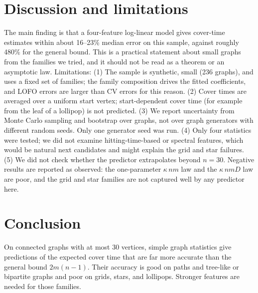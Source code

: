 \documentclass{article} %
\begin{document}
\section{Discussion and limitations}
The main finding is that a four-feature log-linear model gives cover-time estimates within about 16--23\% median error on this sample, against roughly 480\% for the general bound. This is a practical statement about small graphs from the families we tried, and it should not be read as a theorem or an asymptotic law. Limitations:
(1) The sample is synthetic, small (236 graphs), and uses a fixed set of families; the family composition drives the fitted coefficients, and LOFO errors are larger than CV errors for this reason.
(2) Cover times are averaged over a uniform start vertex; start-dependent cover time (for example from the leaf of a lollipop) is not predicted.
(3) We report uncertainty from Monte Carlo sampling and bootstrap over graphs, not over graph generators with different random seeds. Only one generator seed was run.
(4) Only four statistics were tested; we did not examine hitting-time-based or spectral features, which would be natural next candidates and might explain the grid and star failures.
(5) We did not check whether the predictor extrapolates beyond $n=30$.
Negative results are reported as observed: the one-parameter $\kappa\, nm$ law and the $\kappa\, nmD$ law are poor, and the grid and star families are not captured well by any predictor here.

\section{Conclusion}
On connected graphs with at most 30 vertices, simple graph statistics give predictions of the expected cover time that are far more accurate than the general bound $2m(n-1)$. Their accuracy is good on paths and tree-like or bipartite graphs and poor on grids, stars, and lollipops. Stronger features are needed for those families.



\end{document}
